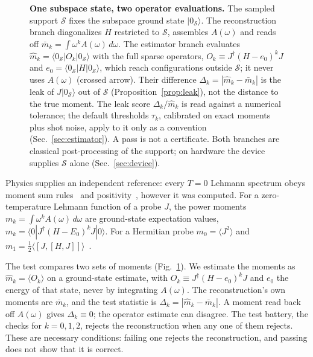 \documentclass[submission, PhysCore]{SciPost}
\begin{document}
\begin{figure}[t]
\centering
{}
\caption{\textbf{One subspace state, two operator evaluations.} The sampled support $\mathcal S$ fixes the subspace ground state $|0_\mathcal S\rangle$. The reconstruction branch diagonalizes $H$ restricted to $\mathcal S$, assembles $A(\omega)$ and reads off $\bar m_k=\int\omega^kA(\omega)\,d\omega$. The estimator branch evaluates $\widehat m_k=\langle 0_\mathcal S|O_k|0_\mathcal S\rangle$ with the full sparse operators, $O_k\equiv J^\dagger(H-e_0)^kJ$ and $e_0=\langle 0_\mathcal S|H|0_\mathcal S\rangle$, which reach configurations outside $\mathcal S$; it never uses $A(\omega)$ (crossed arrow). Their difference $\Delta_k=|\widehat m_k-\bar m_k|$ is the leak of $J|0_\mathcal S\rangle$ out of $\mathcal S$ (Proposition~\ref{prop:leak}), not the distance to the true moment. The leak score $\Delta_k/\widehat m_k$ is read against a numerical tolerance; the default thresholds $\tau_k$, calibrated on exact moments plus shot noise, apply to it only as a convention (Sec.~\ref{sec:estimator}). A pass is not a certificate. Both branches are classical post-processing of the support; on hardware the device supplies $\mathcal S$ alone (Sec.~\ref{sec:device}).}
\label{fig:hero}
\end{figure}

Physics supplies an independent reference: every $T=0$ Lehmann spectrum obeys moment sum rules~\cite{HohenbergMartin1965,Kohn1964,Maldague1977} and positivity~\cite{Lehmann1954}, however it was computed. For a zero-temperature Lehmann function of a probe $J$, the power moments $m_k=\int\omega^kA(\omega)\,d\omega$ are ground-state expectation values, $m_k=\langle 0|J^\dagger(H-E_0)^kJ|0\rangle$. For a Hermitian probe $m_0=\langle J^2\rangle$ and $m_1=\tfrac12\langle[J,[H,J]]\rangle$~\cite{Lehmann1954,Kubo1957,HohenbergMartin1965}.

The test compares two sets of moments (Fig.~\ref{fig:hero}). We estimate the moments as $\widehat m_k=\langle O_k\rangle$ on a ground-state estimate, with $O_k\equiv J^\dagger(H-e_0)^kJ$ and $e_0$ the energy of that state, never by integrating $A(\omega)$. The reconstruction's own moments are $\bar m_k$, and the test statistic is $\Delta_k=|\widehat m_k-\bar m_k|$. A moment read back off $A(\omega)$ gives $\Delta_k\equiv0$; the operator estimate can disagree. The test battery, the checks for $k=0,1,2$, rejects the reconstruction when any one of them rejects. These are necessary conditions: failing one rejects the reconstruction, and passing does not show that it is correct.
\end{document}
